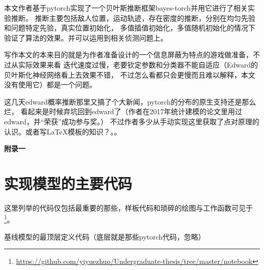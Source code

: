 \documentclass{sicnuthesis}
\begin{document}
本文作者基于pytorch实现了一个贝叶斯推断框架bayes-torch并用它进行了相关实验推断。
推断主要包括敌人位置，运动轨迹，存在密度的推断，分别在均匀先验和问题特定先验，真实位置初始化，
多值插值初始化，多值随机初始化的情况下验证了算法的效果。并可以运用到相关侦测问题上。

写作本文的本来目的就是为作者准备设计的一个信息屏蔽为特点的游戏做准备，不过从实际效果来看
迭代速度过慢，老要钦定参数和分类器不能自适应（Edward的贝叶斯化神经网络看上去效果不错，
不过怎么看都只会更慢而且难以解释，本文没有使用它）都是一个问题。

这几天edward概率推断那里又搞了个大新闻，pytorch的分布的原生支持还是那么烂，
看起来是时候弃坑回到edward了（作者在2017年统计建模的论文\cite{touhou}里用过edward，并“荣获”成功参与奖。）
不过作者多少从手动实现这里获取了点对原理的认识。或者写LaTeX模板的知识？。。


% 
%

\clearpage

 





\clearpage


{\bf 附录一}

\section*{实现模型的主要代码}

这里列举的代码仅包括最重要的那些，样板代码和琐碎的绘图与工作函数可见于
\footnote{\url{https://github.com/yiyuezhuo/Undergraduate-thesis/tree/master/notebook}}。



基线模型的最顶层定义代码（底层就是那些pytorch代码，忽略）
\end{document}
